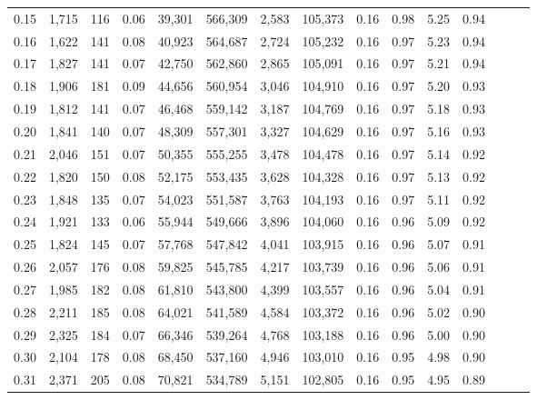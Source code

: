 \begin{tabular}{rrrrrrrrrrrrrrr}
0.15 &   1,715 &    116 &  0.06 &   39,301 &  566,309 &    2,583 &  105,373 &  0.16 &  0.98 &  5.25 &      0.94 \\
0.16 &   1,622 &    141 &  0.08 &   40,923 &  564,687 &    2,724 &  105,232 &  0.16 &  0.97 &  5.23 &      0.94 \\
0.17 &   1,827 &    141 &  0.07 &   42,750 &  562,860 &    2,865 &  105,091 &  0.16 &  0.97 &  5.21 &      0.94 \\
0.18 &   1,906 &    181 &  0.09 &   44,656 &  560,954 &    3,046 &  104,910 &  0.16 &  0.97 &  5.20 &      0.93 \\
0.19 &   1,812 &    141 &  0.07 &   46,468 &  559,142 &    3,187 &  104,769 &  0.16 &  0.97 &  5.18 &      0.93 \\
0.20 &   1,841 &    140 &  0.07 &   48,309 &  557,301 &    3,327 &  104,629 &  0.16 &  0.97 &  5.16 &      0.93 \\
0.21 &   2,046 &    151 &  0.07 &   50,355 &  555,255 &    3,478 &  104,478 &  0.16 &  0.97 &  5.14 &      0.92 \\
0.22 &   1,820 &    150 &  0.08 &   52,175 &  553,435 &    3,628 &  104,328 &  0.16 &  0.97 &  5.13 &      0.92 \\
0.23 &   1,848 &    135 &  0.07 &   54,023 &  551,587 &    3,763 &  104,193 &  0.16 &  0.97 &  5.11 &      0.92 \\
0.24 &   1,921 &    133 &  0.06 &   55,944 &  549,666 &    3,896 &  104,060 &  0.16 &  0.96 &  5.09 &      0.92 \\
0.25 &   1,824 &    145 &  0.07 &   57,768 &  547,842 &    4,041 &  103,915 &  0.16 &  0.96 &  5.07 &      0.91 \\
0.26 &   2,057 &    176 &  0.08 &   59,825 &  545,785 &    4,217 &  103,739 &  0.16 &  0.96 &  5.06 &      0.91 \\
0.27 &   1,985 &    182 &  0.08 &   61,810 &  543,800 &    4,399 &  103,557 &  0.16 &  0.96 &  5.04 &      0.91 \\
0.28 &   2,211 &    185 &  0.08 &   64,021 &  541,589 &    4,584 &  103,372 &  0.16 &  0.96 &  5.02 &      0.90 \\
0.29 &   2,325 &    184 &  0.07 &   66,346 &  539,264 &    4,768 &  103,188 &  0.16 &  0.96 &  5.00 &      0.90 \\
0.30 &   2,104 &    178 &  0.08 &   68,450 &  537,160 &    4,946 &  103,010 &  0.16 &  0.95 &  4.98 &      0.90 \\
0.31 &   2,371 &    205 &  0.08 &   70,821 &  534,789 &    5,151 &  102,805 &  0.16 &  0.95 &  4.95 &      0.89 \\

\end{tabular}
